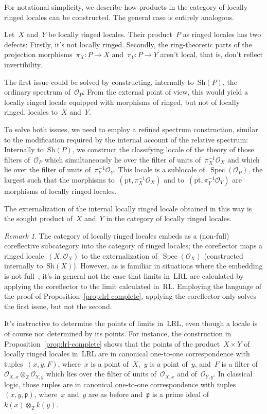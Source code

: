 \documentclass[10pt,reqno,a4paper]{amsbook}
\makeatletter
\theoremstyle{definition}
\theoremstyle{plain}
\theoremstyle{remark}
\newtheorem{rem}[defn]{Remark}
\newcommand{\ZZ}{\mathbb{Z}}
\renewcommand{\O}{\mathcal{O}}
\newcommand{\ppp}{\mathfrak{p}}
\newcommand{\Sh}{\mathrm{Sh}}
\newcommand{\RL}{\mathrm{RL}}
\newcommand{\LRL}{\mathrm{LRL}}
\newcommand{\pt}{\mathrm{pt}}
\DeclareMathOperator{\Spec}{Spec}
\newcommand{\?}{\,{:}\,}
\renewcommand{\_}{\mathpunct{.}\,}
\renewenvironment{proof}[1][\proofname]{\par
  \pushQED{\qed}%
  \normalfont \topsep6\p@\@plus6\p@\relax
  \trivlist
  \item[\hskip\labelsep
        \itshape
    #1\@addpunct{.}]\ignorespaces
}{%
  \popQED\endtrivlist\@endpefalse
}
\makeatother
\begin{document}
\begin{proof}For notational simplicity, we describe how products in the
category of locally ringed locales can be constructed. The general case is
entirely analogous.

Let~$X$ and~$Y$ be locally ringed locales. Their product~$P$ as ringed locales has
two defects: Firstly, it's not locally ringed. Secondly, the ring-theoretic
parts of the projection morphisms~$\pi_X : P \to X$ and~$\pi_Y : P \to Y$
aren't local, that is, don't reflect invertibility.

The first issue could be solved by constructing, internally to~$\Sh(P)$, the
ordinary spectrum of~$\O_P$. From the external point of view, this would yield
a locally ringed locale equipped with morphisms of ringed, but not of locally
ringed, locales to~$X$ and~$Y$.

To solve both issues, we need to employ a refined spectrum construction,
similar to the modification required by the internal account of the relative
spectrum: Internally to~$\Sh(P)$, we construct the classifying locale of the
theory of those filters of~$\O_P$ which simultaneously lie over the filter of
units of~$\pi_X^{-1}\O_X$ and which lie over the filter of units
of~$\pi_Y^{-1}\O_Y$. This locale is a sublocale of~$\Spec(\O_P)$, the largest
such that the morphisms to~$(\pt,\pi_X^{-1}\O_X)$ and to~$(\pt,\pi_Y^{-1}\O_Y)$ are
morphisms of locally ringed locales.

The externalization of the internal locally ringed locale obtained in this way
is the sought product of~$X$ and~$Y$ in the category of locally ringed locales.
\end{proof}

\begin{rem}The category of locally ringed locales embeds as a (non-full)
coreflective subcategory into the category of ringed locales; the coreflector
maps a ringed locale~$(X,\O_X)$ to the externalization of~$\Spec(\O_X)$
(constructed internally to~$\Sh(X)$). However, as is familiar in situations where the embedding
is not full~\cite{adamek:rosicky:reflective}, it's in general not the case that limits in~$\LRL$ are calculated by
applying the coreflector to the limit calculated in~$\RL$. Employing the language
of the proof of Proposition~\ref{prop:lrl-complete}, applying the coreflector only
solves the first issue, but not the second.
\end{rem}

It's instructive to determine the points of limits in~$\LRL$, even though a
locale is of course not determined by its points. For instance, the construction in
Proposition~\ref{prop:lrl-complete} shows that the points of the product~$X
\times Y$ of locally ringed locales in~$\LRL$ are in canonical one-to-one
correspondence with tuples~$(x,y,F)$, where~$x$ is a point of~$X$,~$y$ is a
point of~$y$, and~$F$ is a filter of~$\O_{X,x} \otimes_\ZZ \O_{Y,y}$ which lies
over the filter of units of~$\O_{X,x}$ and of~$\O_{Y,y}$. In classical logic,
those tuples are in canonical one-to-one correspondence with
tuples~$(x,y,\ppp)$, where~$x$ and~$y$ are as before and~$\ppp$ is a prime
ideal of~$k(x) \otimes_\ZZ k(y)$.
\end{document}
